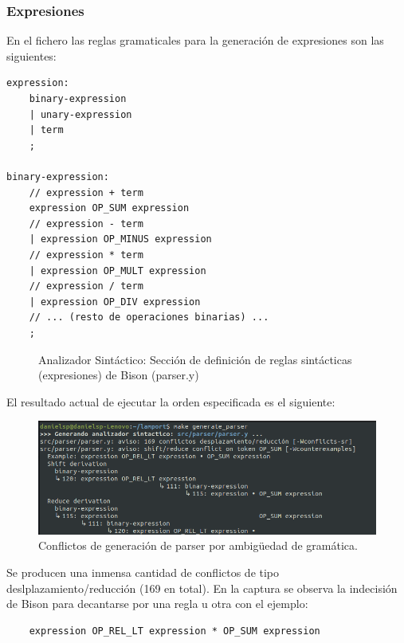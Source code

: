 \subsubsection{Expresiones}
En el fichero  las reglas gramaticales para la generación de expresiones son las siguientes:

\newpage

\begin{lstlisting}[style=customflex]
expression:
    binary-expression
    | unary-expression
    | term
    ;

binary-expression:
    // expression + term
    expression OP_SUM expression
    // expression - term
    | expression OP_MINUS expression
    // expression * term
    | expression OP_MULT expression
    // expression / term
    | expression OP_DIV expression
    // ... (resto de operaciones binarias) ...
    ;

\end{lstlisting}
\begin{figure}[h]
\caption{Analizador Sintáctico: Sección de definición de reglas sintácticas (expresiones) de Bison (parser.y)}
\label{fig:bisonExpressionRules}
\end{figure}

\noindent
El resultado actual de ejecutar la orden especificada es el siguiente:
\begin{figure}[h]
    \includegraphics[width=\linewidth]{images/implementacion/parser/parser_conflicts.png}
    \caption{Conflictos de generación de parser por ambigüedad de gramática.}
    \label{fig:parser_conflictos}
\end{figure}

Se producen una inmensa cantidad de conflictos de tipo deslplazamiento/reducción (169 en total). En la captura se observa la indecisión de Bison para decantarse por una regla u otra con el ejemplo:

\begin{verbatim}
    expression OP_REL_LT expression * OP_SUM expression
\end{verbatim}

